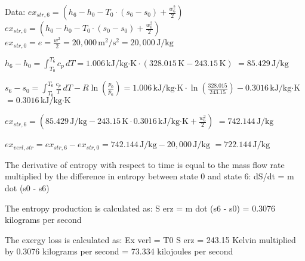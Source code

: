 Data:  
\( ex_{str,6} = (h_6 - h_0 - T_0 \cdot (s_6 - s_0) + \frac{w_6^2}{2}) \)  
\( ex_{str,0} = (h_0 - h_0 - T_0 \cdot (s_0 - s_0) + \frac{w_0^2}{2}) \)  
\( ex_{str,0} = e = \frac{w^2}{2} = 20,000 \, \text{m}^2/\text{s}^2 = 20,000 \, \text{J}/\text{kg} \)  

\( h_6 - h_0 = \int_{T_0}^{T_6} c_{p} \, dT = 1.006 \, \text{kJ}/\text{kg·K} \cdot (328.015 \, \text{K} - 243.15 \, \text{K}) \)  
\( = 85.429 \, \text{J}/\text{kg} \)  

\( s_6 - s_0 = \int_{T_0}^{T_6} \frac{c_{p}}{T} \, dT - R \ln \left( \frac{p_0}{p_6} \right) = 1.006 \, \text{kJ}/\text{kg·K} \cdot \ln \left( \frac{328.015}{243.15} \right) - 0.3016 \, \text{kJ}/\text{kg·K} \)  
\( = 0.3016 \, \text{kJ}/\text{kg·K} \)  

\( ex_{str,6} = (85.429 \, \text{J}/\text{kg} - 243.15 \, \text{K} \cdot 0.3016 \, \text{kJ}/\text{kg·K} + \frac{w_6^2}{2}) \)  
\( = 742.144 \, \text{J}/\text{kg} \)  

\( ex_{verl,str} = ex_{str,6} - ex_{str,0} = 742.144 \, \text{J}/\text{kg} - 20,000 \, \text{J}/\text{kg} \)  
\( = 722.144 \, \text{J}/\text{kg} \)

The derivative of entropy with respect to time is equal to the mass flow rate multiplied by the difference in entropy between state 0 and state 6:  
dS/dt = m dot (s0 - s6)  

The entropy production is calculated as:  
S erz = m dot (s6 - s0) = 0.3076 kilograms per second  

The exergy loss is calculated as:  
Ex verl = T0 S erz = 243.15 Kelvin multiplied by 0.3076 kilograms per second = 73.334 kilojoules per second